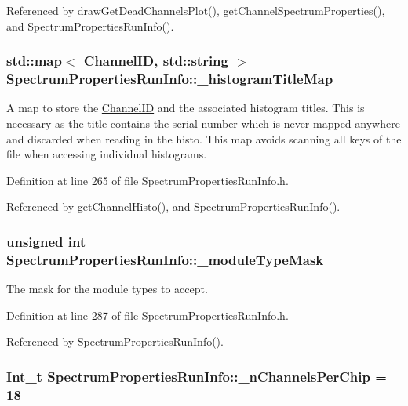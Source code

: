 Referenced by drawGetDeadChannelsPlot(), getChannelSpectrumProperties(), and SpectrumPropertiesRunInfo().\hypertarget{class_spectrum_properties_run_info_a9e75eca5cf3a61ec892a62862d159111}{
\subsubsection[{\_\-histogramTitleMap}]{\setlength{\rightskip}{0pt plus 5cm}std::map$<$ {\bf ChannelID}, std::string $>$ {\bf SpectrumPropertiesRunInfo::\_\-histogramTitleMap}}}
\label{class_spectrum_properties_run_info_a9e75eca5cf3a61ec892a62862d159111}


A map to store the \hyperlink{class_spectrum_properties_run_info_1_1_channel_i_d}{ChannelID} and the associated histogram titles. This is necessary as the title contains the serial number which is never mapped anywhere and discarded when reading in the histo. This map avoids scanning all keys of the file when accessing individual histograms. 

Definition at line 265 of file SpectrumPropertiesRunInfo.h.

Referenced by getChannelHisto(), and SpectrumPropertiesRunInfo().\hypertarget{class_spectrum_properties_run_info_a4d7328dfa2acc72cbaaf1b897c975b62}{
\subsubsection[{\_\-moduleTypeMask}]{\setlength{\rightskip}{0pt plus 5cm}unsigned int {\bf SpectrumPropertiesRunInfo::\_\-moduleTypeMask}}}
\label{class_spectrum_properties_run_info_a4d7328dfa2acc72cbaaf1b897c975b62}


The mask for the module types to accept. 

Definition at line 287 of file SpectrumPropertiesRunInfo.h.

Referenced by SpectrumPropertiesRunInfo().\hypertarget{class_spectrum_properties_run_info_ac56bc4e28473056ac6daad4a7645fbf9}{
\subsubsection[{\_\-nChannelsPerChip}]{\setlength{\rightskip}{0pt plus 5cm}Int\_\-t {\bf SpectrumPropertiesRunInfo::\_\-nChannelsPerChip} = 18}}
\label{class_spectrum_properties_run_info_ac56bc4e28473056ac6daad4a7645fbf9}


